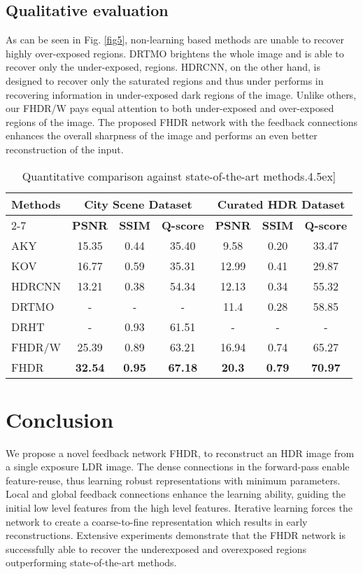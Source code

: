 \documentclass[conference]{IEEEtran}
\begin{document}
\begin{figure*}
\subsection{Qualitative evaluation}
As can be seen in Fig. \ref{fig5}, non-learning based methods are unable to recover highly over-exposed regions. DRTMO brightens the whole image and is able to recover only the under-exposed, regions. HDRCNN, on the other hand, is designed to recover only the saturated regions and thus under performs in recovering information in under-exposed dark regions of the image. Unlike others, our FHDR/W pays equal attention to both under-exposed and over-exposed regions of the image. The proposed FHDR network with the feedback connections enhances the overall sharpness of the image and performs an even better reconstruction of the input. 



\begin{table}[htbp]
\centering
\begin{tabular}{|p{1.4cm}|c|c|c|c|c|c|}
\hline
\multirow{2}{*}{\textbf{Methods}} & \multicolumn{3}{|c|}{\textbf{City Scene Dataset}}&\multicolumn{3}{|c|}{\textbf{Curated HDR Dataset}} \\
\cline{2-7} 
& \textbf{PSNR}& \textbf{SSIM}& \textbf{Q-score} & \textbf{PSNR}& \textbf{SSIM}& \textbf{Q-score} \\
\hline
AKY\cite{akyuz2007hdr} & 15.35 & 0.44 & 35.40 & 9.58 & 0.20 & 33.47 \\
\hline
KOV\cite{kovaleski2014high} & 16.77 & 0.59 & 35.31 & 12.99 & 0.41 & 29.87 \\
\hline
HDRCNN\cite{eilertsen2017hdr} & 13.21 & 0.38 & 54.34 & 12.13 & 0.34 & 55.32 \\
\hline
DRTMO\cite{endo2017deep} & - & - & - & 11.4 & 0.28 & 58.85 \\
\hline
DRHT\cite{yang2018image} & - & 0.93 & 61.51 & - & - & - \\
\hline
FHDR/W & 25.39 & 0.89 & 63.21 & 16.94 & 0.74 & 65.27 \\
\hline
FHDR & \textbf{32.54} & \textbf{0.95} & \textbf{67.18} & \textbf{20.3} & \textbf{0.79} & \textbf{70.97} \\
\hline
\end{tabular}
\label{tab1}
\caption{Quantitative comparison against state-of-the-art methods.\-4.5ex]}
\end{table}
\section{Conclusion}
We propose a novel feedback network FHDR, to reconstruct an HDR image from a single exposure LDR image. The dense connections in the forward-pass enable feature-reuse, thus learning robust representations with minimum parameters. Local and global feedback connections enhance the learning ability, guiding the initial low level features from the high level features.
Iterative learning forces the network to create a coarse-to-fine representation which results in early reconstructions. 
Extensive experiments demonstrate that the FHDR network is successfully able to recover the underexposed and overexposed regions outperforming state-of-the-art methods.


\end{figure*}
\end{document}
